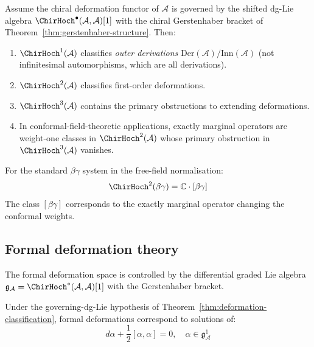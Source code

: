 \begin{theorem}\label{thm:deformation-classification}
Assume the chiral deformation functor of $\mathcal A$ is governed by
the shifted dg-Lie algebra
$\ChirHoch^\bullet(\mathcal A,\mathcal A)[1]$ with the chiral
Gerstenhaber bracket of Theorem~\textup{\ref{thm:gerstenhaber-structure}}.
Then:
\begin{enumerate}
\item $\ChirHoch^1(\mathcal{A})$ classifies \emph{outer derivations} $\mathrm{Der}(\mathcal{A})/\mathrm{Inn}(\mathcal{A})$ (not infinitesimal automorphisms, which are all derivations).
\item $\ChirHoch^2(\mathcal{A})$ classifies first-order deformations.
\item $\ChirHoch^3(\mathcal{A})$ contains the primary obstructions to extending deformations.
\item In conformal-field-theoretic applications, exactly marginal
operators are weight-one classes in $\ChirHoch^2(\mathcal A)$ whose
primary obstruction in $\ChirHoch^3(\mathcal A)$ vanishes.
\end{enumerate}
\end{theorem}

\begin{example}
For the standard $\beta\gamma$ system in the free-field normalisation:
\[\ChirHoch^2(\beta\gamma) = \mathbb{C} \cdot [\beta\gamma]\]
The class $[\beta\gamma]$ corresponds to the exactly marginal operator changing the conformal weights.
\end{example}

\subsection{Formal deformation theory}

The formal deformation space is controlled by the differential graded Lie algebra
$\mathfrak{g}_{\mathcal{A}} = \ChirHoch^*(\mathcal{A}, \mathcal{A})[1]$
with the Gerstenhaber bracket.

\begin{theorem}\label{thm:maurer-cartan-deformations}
Under the governing-dg-Lie hypothesis of
Theorem~\textup{\ref{thm:deformation-classification}}, formal
deformations correspond to solutions of:
\[d\alpha + \frac{1}{2}[\alpha, \alpha] = 0, \quad \alpha \in \mathfrak{g}_{\mathcal{A}}^1\]
\end{theorem}

